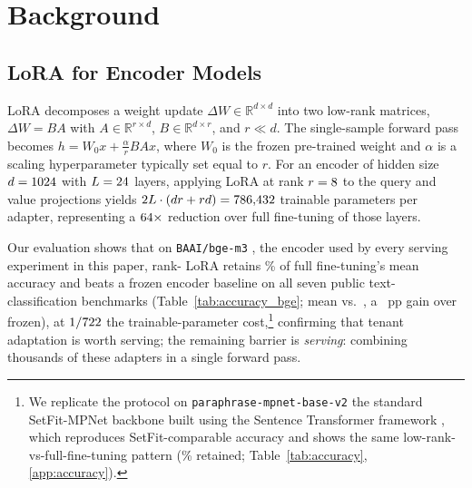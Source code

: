 \documentclass[11pt]{article}
\begin{document}
\section{Background}
\label{sec:background}

\subsection{LoRA for Encoder Models}
\label{sec:background_lora}

LoRA \cite{hu2022lora} decomposes a weight update $\Delta W \in
\mathbb{R}^{d \times d}$ into two low-rank matrices, $\Delta W = B A$ with
$A \in \mathbb{R}^{r \times d}$, $B \in \mathbb{R}^{d \times r}$, and $r \ll d$.
The single-sample forward pass becomes $h = W_0 x + \frac{\alpha}{r} B A x$,
where $W_0$ is the frozen pre-trained weight and $\alpha$ is a scaling
hyperparameter typically set equal to $r$.
For an encoder of hidden size $d = 1024$ with $L = 24$
layers, applying LoRA
at rank $r = 8$ to the query and value projections yields
$2 L \cdot (d r + r d) = 786{,}432$ trainable parameters per adapter, representing a
$64\times$ reduction over full fine-tuning
of those layers.

Our evaluation shows that on \texttt{BAAI/bge-m3} \cite{chen2024bge}, the
encoder used by every serving experiment in this paper, rank-\HeadlineRank{}
LoRA retains \SetfitBgeRetainsPct\% of full fine-tuning's mean accuracy and
beats a frozen encoder baseline on all seven public
text-classification benchmarks (Table~\ref{tab:accuracy_bge}; mean
  \SetfitBgeMeanLora{} vs.\ \SetfitBgeMeanFrozen{}, a
\SetfitBgeLoraGainOverFrozenPP~pp gain over frozen), at
$1/722$ the trainable-parameter cost,\footnote{We
  replicate the protocol on \texttt{paraphrase-mpnet-base-v2}
  the standard SetFit-MPNet backbone \cite{tunstall2022efficient}
  built using the Sentence Transformer framework \cite{reimers2019sentencebert},
  which reproduces SetFit-comparable accuracy and shows the same
  low-rank-vs-full-fine-tuning pattern (\SetfitRetainsPct\% retained;
Table~\ref{tab:accuracy}, \ref{app:accuracy}).} confirming that
tenant adaptation is worth serving; the remaining
barrier is \emph{serving}: combining thousands of these adapters in a single
forward pass.

\begin{table}[h]
  \centering
  \footnotesize
  \setlength{\tabcolsep}{4pt}
  \caption{Per-task accuracy on \texttt{BAAI/bge-m3}, the serving model
    ($N{=}8$ examples per class, rank=8, mean over 10 seeds; protocol in
    \ref{app:accuracy}). \emph{Frozen} fits only the classification
    head on the pre-trained encoder's embeddings; $\Delta$ is LoRA minus
  Full~FT. Scores are accuracy except Amazon-CF (MCC).}
  \label{tab:accuracy_bge}
  
\end{table}
\end{document}
